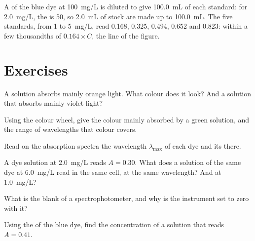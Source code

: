 \begin{example}\label{ex:g11:absorbance:standards}
A  of the blue dye at \qty{100}{mg/L} is diluted to give
\qty{100.0}{mL} of each standard: for \qty{2.0}{mg/L}, the  is 50, so \qty{2.0}{mL} of stock are made up to \qty{100.0}{mL}.
The five standards, from 1 to \qty{5}{mg/L}, read 0.168, 0.325, 0.494,
0.652 and 0.823: within a few thousandths of $0.164 \times C$, the line
of the figure.
\end{example}

\section{Exercises}

\begin{exercise}[$\star$]\label{exo:g11:absorbance:1}
A solution absorbs mainly orange light. What colour does it look? And a
solution that absorbs mainly violet light?
\end{exercise}

\begin{exercise}[$\star$]\label{exo:g11:absorbance:2}
Using the colour wheel, give the colour mainly absorbed by a green
solution, and the range of wavelengths that colour covers.
\end{exercise}

\begin{exercise}[$\star$]\label{exo:g11:absorbance:3}
Read on the absorption spectra the wavelength $\lambda_{\max}$ of each
dye and its  there.
\end{exercise}

\begin{exercise}[$\star$]\label{exo:g11:absorbance:4}
A dye solution at \qty{2.0}{mg/L} reads $A = 0.30$. What does a solution
of the same dye at \qty{6.0}{mg/L} read in the same cell, at the same
wavelength? And at \qty{1.0}{mg/L}?
\end{exercise}

\begin{exercise}[$\star$]\label{exo:g11:absorbance:5}
What is the blank of a spectrophotometer, and why is the instrument set
to zero with it?
\end{exercise}

\begin{exercise}[$\star\star$]\label{exo:g11:absorbance:6}
Using the  of the blue dye, find the concentration of a
solution that reads $A = 0.41$.
\end{exercise}

